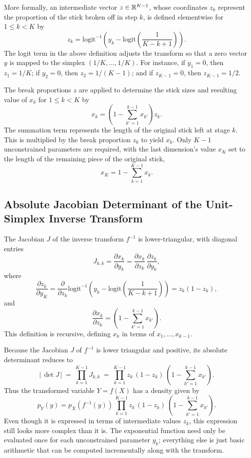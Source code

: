 More formally, an intermediate vector $z \in \mathbb{R}^{K-1}$, whose
coordinates $z_k$ represent the proportion of the stick broken off in
step $k$, is defined elementwise for $1 \leq k < K$ by
%
\[
z_k = \mbox{logit}^{-1} \left( y_k 
                             - \mbox{logit} \left( \frac{1}{K - k + 1}
                                            \right)
                       \right).
\]
%
The logit term in the above definition adjusts the transform so that a
zero vector $y$ is mapped to the simplex $(1/K,\ldots,1/K)$.  For instance, if
$y_1 = 0$, then $z_1 = 1/K$; if $y_2 = 0$, then $z_2 = 1/(K-1)$; and
if $z_{K-1} = 0$, then $z_{K-1} = 1/2$.  

The break proportions $z$ are applied to determine the stick sizes and
resulting value of $x_k$ for $1 \leq k < K$ by
%
\[
x_k = 
\left( 1 - \sum_{k'=1}^{k-1} x_{k'} \right) z_k.
\]
%
The summation term represents the length of the original stick left at
stage $k$.  This is multiplied by the break proportion $z_k$ to yield
$x_k$.  Only $K-1$ unconstrained parameters are required, with
the last dimension's value $x_K$ set to the length of the remaining
piece of the original stick,
\[
x_K = 1 - \sum_{k=1}^{K-1} x_k.
\]

\subsection{Absolute Jacobian Determinant of the Unit-Simplex
  Inverse Transform}

The Jacobian $J$ of the inverse transform $f^{-1}$ is
lower-triangular, with diagonal entries
\[
J_{k,k}
=
\frac{\partial x_k}{\partial y_k}
=
\frac{\partial x_k}{\partial z_k} \,
\frac{\partial z_k}{\partial y_k},
\]
%
where
\[
\frac{\partial z_k}{\partial y_K} 
= \frac{\partial}{\partial z_k} 
   \mbox{logit}^{-1} \left(
                       y_k - \mbox{logit} \left( \frac{1}{K-k+1}
                                          \right)
                    \right)
= z_k (1 - z_k),
\]
%
and
%
\[
\frac{\partial x_k}{\partial z_k}
=
\left( 
  1 - \sum_{k' = 1}^{k-1} x_{k'}
   \right)
.
\]
%
This definition is recursive, defining $x_k$ in terms of
$x_{1},\ldots,x_{k-1}$.

Because the Jacobian $J$ of $f^{-1}$ is lower triangular and positive, its
absolute determinant reduces to
%
\[
\left| \, \det J \, \right|
\ = \
\prod_{k=1}^{K-1} J_{k,k}
\ = \
\prod_{k=1}^{K-1} 
z_k
\, 
(1 - z_k)
\
\left(
1 - \sum_{k'=1}^{k-1} x_{k'}
\right)
.
\]
%
Thus the transformed variable $Y = f(X)$ has a density given by
%
\[
p_Y(y) 
= p_X(f^{-1}(y))
\,
\prod_{k=1}^{K-1} 
z_k
\, 
(1 - z_k)
\
\left(
1 - \sum_{k'=1}^{k-1} x_{k'}
\right)
.
\]
%
Even though it is expressed in terms of intermediate values $z_k$,
this expression still looks more complex than it is. The exponential
function need only be evaluated once for each unconstrained parameter
$y_k$; everything else is just basic arithmetic that can be computed
incrementally along with the transform.

